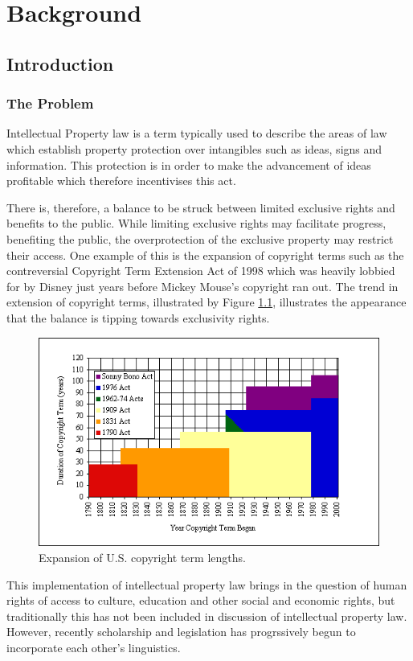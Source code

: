 \chapter{Background}
	\section{Introduction}
		\subsection{The Problem}
			Intellectual Property law is a term typically used to describe the areas of law which establish property protection over intangibles such as ideas, signs and information. This protection is in order to make the advancement of ideas profitable which therefore incentivises this act\cite{ip_edu_bently}.
			
			There is, therefore, a balance to be struck between limited exclusive rights and benefits to the public. While limiting exclusive rights may facilitate progress, benefiting the public, the overprotection of the exclusive property may restrict their access\cite{handbook_ip_hr_geiger}. One example of this is the expansion of copyright terms such as the contreversial Copyright Term Extension Act of 1998 which was heavily lobbied for by Disney just years before Mickey Mouse's copyright ran out\cite{mickey_mouse_grzelak}. The trend in extension of copyright terms, illustrated by Figure \ref{fig:ext_us_cop}, illustrates the appearance that the balance is tipping towards exclusivity rights. 

			\begin{figure}[h]
    			\centering
    			\includegraphics[width=0.5\linewidth]{resources/images/extention_of_us_copyright.png}
    			\caption{Expansion of U.S. copyright term lengths\cite{copyright_term_length_graph_bell}.}
    			\label{fig:ext_us_cop}
			\end{figure}
			
			This implementation of intellectual property law brings in the question of human rights of access to culture, education and other social and economic rights, but traditionally this has not been included in discussion of intellectual property law\cite{mapping_ip_hr_helfer}. However, recently scholarship and legislation has progrssively begun to incorporate each other's linguistics\cite{bileta_proposal_blakely}.
			
